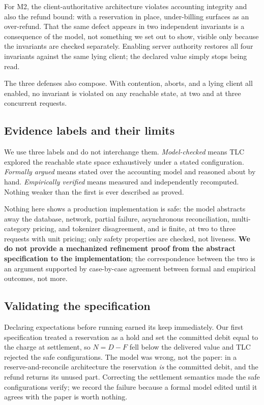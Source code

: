 \documentclass[manuscript,review]{acmart}
\begin{document}
For M2, the client-authoritative architecture violates accounting integrity and also the
refund bound: with a reservation in place, under-billing surfaces as an over-refund. That
the same defect appears in two independent invariants is a consequence of the model, not
something we set out to show, visible only because the invariants are checked
separately. Enabling server authority restores all four invariants
against the same lying client; the declared value simply stops being read.

The three defenses also compose. With contention, aborts, and a lying client all enabled,
no invariant is violated on any reachable state, at two and at three concurrent requests.

\subsection{Evidence labels and their limits}
We use three labels and do not interchange them. \emph{Model-checked} means TLC explored
the reachable state space exhaustively under a stated configuration. \emph{Formally
argued} means stated over the accounting model and reasoned about by hand.
\emph{Empirically verified} means measured and independently recomputed. Nothing weaker
than the first is ever described as proved.

Nothing here shows a production implementation is safe: the model abstracts away the
database, network, partial failure, asynchronous reconciliation, multi-category pricing,
and tokenizer disagreement, and is finite, at two to three requests with unit pricing;
only safety properties are checked, not liveness. \textbf{We
do not provide a mechanized refinement proof from the abstract specification to the
implementation}; the correspondence between the two is an argument supported by
case-by-case agreement between formal and empirical outcomes, not more.

\subsection{Validating the specification}
Declaring expectations before running earned its keep immediately. Our first
specification treated a reservation as a hold and set the committed debit equal to the
charge at settlement, so $N = D - F$ fell below the delivered value and TLC rejected the
safe configurations. The model was wrong, not the paper: in a reserve-and-reconcile
architecture the reservation \emph{is} the committed debit, and the refund returns its
unused part. Correcting the settlement semantics made the safe configurations verify; we record the
failure because a formal model edited until it agrees with the paper is worth nothing.
\end{document}
